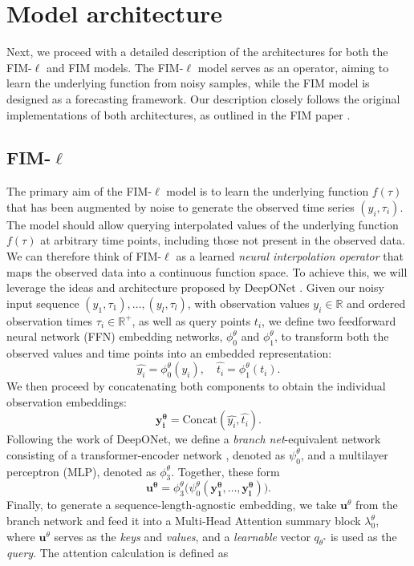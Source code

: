 \documentclass{article}
\theoremstyle{plain}
\theoremstyle{definition}
\theoremstyle{remark}
\begin{document}
\section{Model architecture}
Next, we proceed with a detailed description of the architectures for both the FIM-$\ell$ and FIM models. The FIM-$\ell$ model serves as an operator, aiming to learn the underlying function from noisy samples, while the FIM model is designed as a forecasting framework. Our description closely follows the original implementations of both architectures, as outlined in the FIM paper \cite{fim-l}.

\subsection{FIM-$\ell$}\label{sec:FIM-l}
The primary aim of the FIM-$\ell$ model is to learn the underlying function $f(\tau)$ that has been augmented by noise to generate the observed time series $(y_i, \tau_i)$. The model should allow querying interpolated values of the underlying function $f(\tau)$ at arbitrary time points, including those not present in the observed data.
We can therefore think of FIM-$\ell$ as a learned \emph{neural interpolation operator} that maps the observed data into a continuous function space. To achieve this, we will leverage the ideas and architecture proposed by DeepONet \cite{Deeponet}.
Given our noisy input sequence \((y_1, \tau_1), \ldots, (y_l, \tau_l)\), with observation values \(y_i \in \mathbb{R}\) and ordered observation times \(\tau_i \in \mathbb{R}^+\), as well as query points \(t_i\), we define two feedforward neural network (FFN) embedding networks, \(\phi^{\theta}_0\) and \(\phi^{\theta}_1\), to transform both the observed values and time points into an embedded representation:
\[
    \hat{y_i} = \phi^{\theta}_0(y_i), \quad
    \hat{t_i} = \phi^{\theta}_1(t_i).
\]
We then proceed by concatenating both components to obtain the individual observation embeddings:
\[
    \mathbf{y^{\theta}_i} = \text{Concat}(\hat{y_i}, \hat{t_i}).
\]
Following the work of DeepONet, we define a \emph{branch net}-equivalent network consisting of a transformer-encoder network \cite{vaswani2023attentionneed}, denoted as $\psi^{\theta}_0$, and a multilayer perceptron (MLP), denoted as $\phi^{\theta}_3$. Together, these form
\[
    \mathbf{u^{\theta}} = \phi^{\theta}_3\big(\psi^{\theta}_0(\mathbf{y^{\theta}_1}, \dots, \mathbf{y^{\theta}_l})\big).
\]
Finally, to generate a sequence-length-agnostic embedding, we take \(\mathbf{u}^{\theta}\) from the branch network and feed it into a Multi-Head Attention \cite{vaswani2023attentionneed} summary block $\lambda^{\theta}_0$, where \(\mathbf{u}^{\theta}\) serves as the \emph{keys} and \emph{values}, and a \emph{learnable} vector \(q_{\theta^*}\) is used as the \emph{query}. The attention calculation is defined as 
\end{document}
